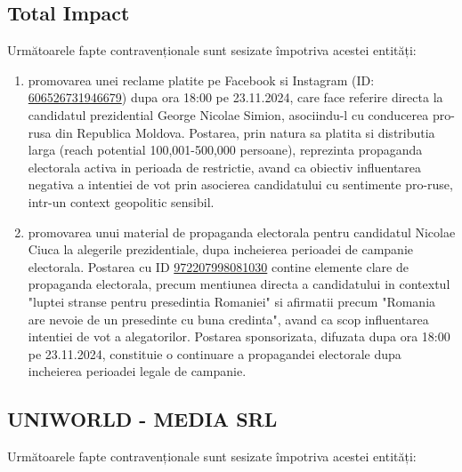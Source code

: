 \documentclass[a4paper,12pt]{article}
\begin{document}
\subsection{Total Impact}
Următoarele fapte contravenționale sunt sesizate împotriva acestei entități:

\begin{enumerate}[leftmargin=*, label=\arabic*.)]
    \item promovarea unei reclame platite pe Facebook si Instagram (ID: \href{https://www.facebook.com/ads/library/?id=606526731946679}{606526731946679}) dupa ora 18:00 pe 23.11.2024, care face referire directa la candidatul prezidential George Nicolae Simion, asociindu-l cu conducerea pro-rusa din Republica Moldova. Postarea, prin natura sa platita si distributia larga (reach potential 100,001-500,000 persoane), reprezinta propaganda electorala activa in perioada de restrictie, avand ca obiectiv influentarea negativa a intentiei de vot prin asocierea candidatului cu sentimente pro-ruse, intr-un context geopolitic sensibil.
    \item promovarea unui material de propaganda electorala pentru candidatul Nicolae Ciuca la alegerile prezidentiale, dupa incheierea perioadei de campanie electorala. Postarea cu ID \href{https://www.facebook.com/ads/library/?id=972207998081030}{972207998081030} contine elemente clare de propaganda electorala, precum mentiunea directa a candidatului in contextul "luptei stranse pentru presedintia Romaniei" si afirmatii precum "Romania are nevoie de un presedinte cu buna credinta", avand ca scop influentarea intentiei de vot a alegatorilor. Postarea sponsorizata, difuzata dupa ora 18:00 pe 23.11.2024, constituie o continuare a propagandei electorale dupa incheierea perioadei legale de campanie.
\end{enumerate}

\vspace{0.5cm}

\subsection{UNIWORLD - MEDIA SRL}
Următoarele fapte contravenționale sunt sesizate împotriva acestei entități:
\end{document}
